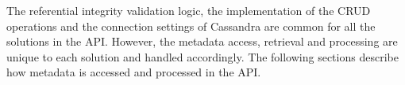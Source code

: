 	The referential integrity validation logic,  the implementation of the \ac{CRUD}
	operations and the connection settings of Cassandra  are common for
	all the solutions in the \ac{API}.  However,  the metadata access,  retrieval and
	processing are unique to each solution and handled accordingly.  The following
	sections describe how metadata is  
	accessed and processed in the \ac{API}. 

